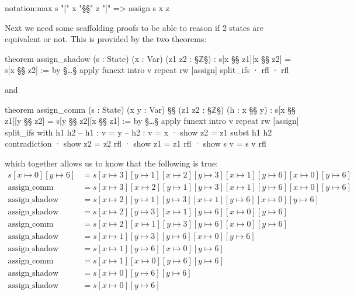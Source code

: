 \begin{Lean_Code}
notation:max s "[" x "§\mapsto§" z "]" => assign s x z
\end{Lean_Code}
Next we need some scaffolding proofs to be able to reason if 2 states are equivalent or not.
This is provided by the two theorems:
\begin{Lean_Code}
theorem assign_shadow (s : State) (x : Var) (z1 z2 : §\(\mathbb{Z}\)§) :
  s[x §\mapsto§ z1][x §\mapsto§ z2] = s[x §\mapsto§ z2] := by §\dots§
  apply funext
  intro v
  repeat rw [assign]
  split_ifs
  · rfl
  · rfl
\end{Lean_Code}
and
\begin{Lean_Code}
theorem assign_comm (s : State) (x y : Var) §\leanbreak§ (z1 z2 : §\(\mathbb{Z}\)§) (h : x §\neq§ y) :
  s[x §\mapsto§ z1][y §\mapsto§ z2] = s[y §\mapsto§ z2][x §\mapsto§ z1] := by §\dots§
  apply funext
  intro v
  repeat rw [assign]
  split_ifs with h1 h2
  -- h1 : v = y
  -- h2 : v = x
  · show z2 = z1
    subst h1 h2
    contradiction
  · show z2 = z2
    rfl
  · show z1 = z1
    rfl
  · show s v = s v
    rfl
\end{Lean_Code}
which together allows us to know that the following is true:
\begin{align*}
  s[x \mapsto 0][y \mapsto 6] &= s[x \mapsto 3][y \mapsto 1][x \mapsto 2][y \mapsto 3][x \mapsto 1][y \mapsto 6][x \mapsto 0][y \mapsto 6] \\
  \text{assign\_comm}   &= s[x \mapsto 3][x \mapsto 2][y \mapsto 1][y \mapsto 3][x \mapsto 1][y \mapsto 6][x \mapsto 0][y \mapsto 6] \\
  \text{assign\_shadow} &= s[x \mapsto 2][y \mapsto 1][y \mapsto 3][x \mapsto 1][y \mapsto 6][x \mapsto 0][y \mapsto 6] \\
  \text{assign\_shadow} &= s[x \mapsto 2][y \mapsto 3][x \mapsto 1][y \mapsto 6][x \mapsto 0][y \mapsto 6] \\
  \text{assign\_comm}   &= s[x \mapsto 2][x \mapsto 1][y \mapsto 3][y \mapsto 6][x \mapsto 0][y \mapsto 6] \\
  \text{assign\_shadow} &= s[x \mapsto 1][y \mapsto 3][y \mapsto 6][x \mapsto 0][y \mapsto 6] \\
  \text{assign\_shadow} &= s[x \mapsto 1][y \mapsto 6][x \mapsto 0][y \mapsto 6] \\
  \text{assign\_comm}   &= s[x \mapsto 1][x \mapsto 0][y \mapsto 6][y \mapsto 6] \\
  \text{assign\_shadow} &= s[x \mapsto 0][y \mapsto 6][y \mapsto 6] \\
  \text{assign\_shadow} &= s[x \mapsto 0][y \mapsto 6]
\end{align*}

